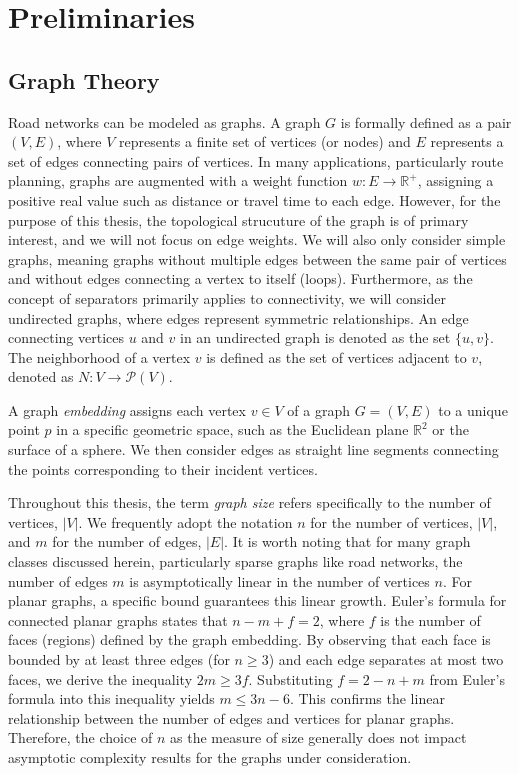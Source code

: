\chapter{Preliminaries}
\label{ch:preliminaries}


\section{Graph Theory}
\label{sec:graphtheory}

Road networks can be modeled as graphs.
A graph \(G\) is formally defined as a pair \((V, E)\), where \(V\) represents a finite set of vertices (or nodes) and \(E\) represents a set of edges connecting pairs of vertices.
In many applications, particularly route planning, graphs are augmented with a weight function \(w: E \to \mathbb{R}^+\), assigning a positive real value such as distance or travel time to each edge.
However, for the purpose of this thesis, the topological strucuture of the graph is of primary interest, and we will not focus on edge weights.
We will also only consider simple graphs, meaning graphs without multiple edges between the same pair of vertices and without edges connecting a vertex to itself (loops).
Furthermore, as the concept of separators primarily applies to connectivity, we will consider undirected graphs, where edges represent symmetric relationships.
An edge connecting vertices \(u\) and \(v\) in an undirected graph is denoted as the set \(\{u,v\}\).
The neighborhood of a vertex \(v\) is defined as the set of vertices adjacent to \(v\), denoted as \(N : V \to \mathcal{P}(V)\).

A graph \emph{embedding} assigns each vertex \(v \in V\) of a graph \(G = (V, E)\) to a unique point \(p\) in a specific geometric space, such as the Euclidean plane \(\mathbb{R}^2\) or the surface of a sphere.
We then consider edges as straight line segments connecting the points corresponding to their incident vertices.

Throughout this thesis, the term \emph{graph size} refers specifically to the number of vertices, \(|V|\).
We frequently adopt the notation \(n\) for the number of vertices, \(|V|\), and \(m\) for the number of edges, \(|E|\).
It is worth noting that for many graph classes discussed herein, particularly sparse graphs like road networks, the number of edges \(m\) is asymptotically linear in the number of vertices \(n\).
For planar graphs, a specific bound guarantees this linear growth.
Euler's formula for connected planar graphs states that \(n - m + f = 2\), where \(f\) is the number of faces (regions) defined by the graph embedding.
By observing that each face is bounded by at least three edges (for \(n \ge 3\)) and each edge separates at most two faces, we derive the inequality \(2m \ge 3f\).
Substituting \(f = 2 - n + m\) from Euler's formula into this inequality yields \(m \le 3n - 6\).
This confirms the linear relationship between the number of edges and vertices for planar graphs.
Therefore, the choice of \(n\) as the measure of size generally does not impact asymptotic complexity results for the graphs under consideration.

